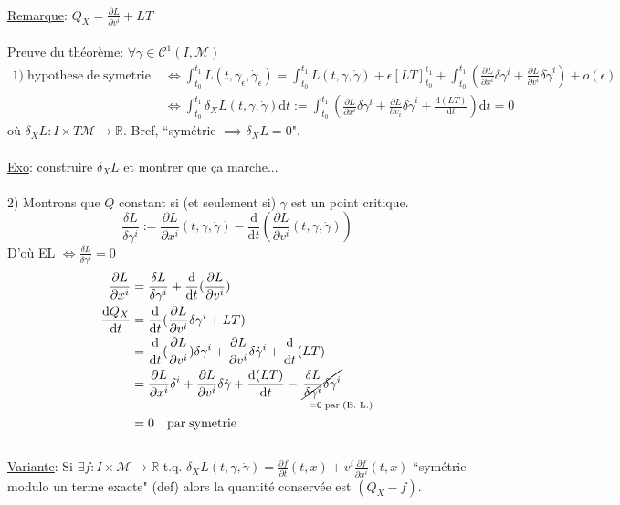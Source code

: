 \documentclass[a4paper,11pt]{article}
\renewcommand{\d}{{\mathrm{d}}}
\newcommand{\dr}[2]{\frac{\partial {#1}}{\partial{#2}}}
\begin{document}
\\
\underline{Remarque}: $Q_X = \dr{L}{v^i} + LT$\\ \\
Preuve du théorème:
$\forall \gamma \in \mathcal{C}^1(I,\mathcal{M})$\\
\begin{align*}
1) \;\mathrm{hypothese}\;\mathrm{de}\;\mathrm{symetrie}\;
&\iff \int_{t_0}^{t_1} L(t,\gamma_\epsilon,\dot\gamma_\epsilon) = \int_{t_0}^{t_1}L(t,\gamma,\dot\gamma) + \epsilon [LT]_{t_0}^{t_1} + \int_{t_0}^{t_1} \left(\dr{L}{x^i}\delta \gamma^i + \dr{L}{v^i}\delta\dot\gamma^i\right) +o(\epsilon)\\
&\iff \int_{t_0}^{t_1} \delta_X L(t,\gamma,\dot\gamma) \d t:=\int_{t_0}^{t_1} \left(\dr{L}{x^i}\delta \gamma^i + \dr{L}{v_i}\delta\dot \gamma^i + \frac{\d (LT)}{\d t}\right)\d t =0
\end{align*}
où $\delta_X L : I\times T\mathcal{M} \to \mathbb{R}$. 
Bref, ``symétrie $\implies \delta_X L = 0$".\\
\\
\underline{Exo}: construire $\delta_X L$ et montrer que ça marche...\\
\\
2) Montrons que $Q$ constant si (et seulement si) $\gamma$ est un point critique.
$$\frac{\delta L}{\delta \gamma^i} := \dr{L}{x^i}(t,\gamma,\dot\gamma) - \frac{\d}{\d t}(\dr{L}{v^i}(t,\gamma,\dot\gamma))$$
D'où EL $\iff \frac{\delta L}{\delta \gamma^i}=0$
\begin{align*}
\dr{L}{x^i}&= \frac{\delta L}{\delta \gamma^i} + \frac{\d}{\d t}(\dr{L}{v^i})\\
\frac{\d Q_X}{\d t}
&= \frac{\d}{\d t} (\dr{L}{v^i}\delta \gamma^i + LT)\\
&= \frac{\d}{\d t} (\dr{L}{v^i})\delta \gamma^i + \dr{L}{v^i} \delta\dot\gamma^i+\frac{\d}{\d t}(LT)\\
&= \dr{L}{x^i} \delta^i+\dr{L}{v^i}\delta \dot \gamma + \frac{\d (LT)}{\d t} - \!\!\!\!\!\!\!\!\!\!\!\!\!\!
\underset{\quad\quad\quad=0\;\mathrm{par}\;(\mathrm{E}.\scalebox{0.75}[1.0]{-}\mathrm{L}.)}{\cancel{\frac{\delta L}{\delta \gamma^i}\delta \gamma^i}}\\
&=0 \quad \mathrm{par} \; \mathrm{symetrie}
\end{align*}
\\
\underline{Variante}: Si $\exists f:I\times\mathcal{M}\to \mathbb{R}$ t.q. $\delta_X L(t,\gamma,\dot\gamma) = \frac{\partial f}{\partial t}(t,x) + v^i \frac{\partial f}{\partial x^i}(t,x)$ ``symétrie modulo un terme exacte" (def) alors la quantité conservée est $(Q_X -f)$.\\
\end{document}
